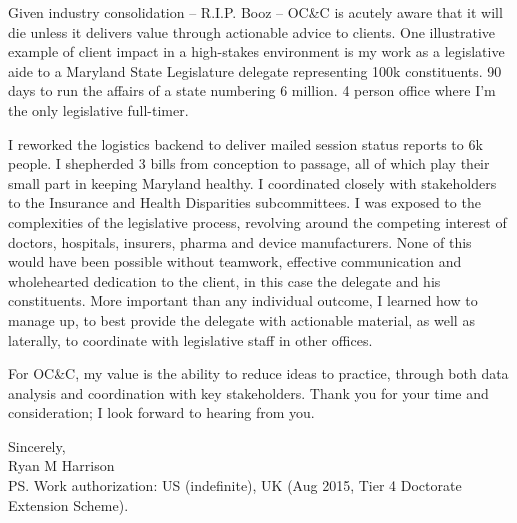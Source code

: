 \documentclass{../res}
\begin{document}
\begin{sloppypar}
\begin{resume}
Given industry consolidation -- R.I.P. Booz -- OC\&C is acutely aware that it will die unless it delivers value through actionable advice to clients. One illustrative example of client impact in a high-stakes environment is my work as a legislative aide to a Maryland State Legislature delegate representing 100k constituents. 90 days to run the affairs of a state numbering 6 million. 4 person office where I'm the only legislative full-timer.

I reworked the logistics backend to deliver mailed session status reports to 6k people. I shepherded 3 bills from conception to passage, all of which play their small part in keeping Maryland healthy. I coordinated closely with stakeholders to the Insurance and Health Disparities subcommittees. I was exposed to the complexities of the legislative process, revolving around the competing interest of doctors, hospitals, insurers, pharma and device manufacturers. None of this would have been possible without teamwork, effective communication and wholehearted dedication to the client, in this case the delegate and his constituents. More important than any individual outcome, I learned how to manage up, to best provide the delegate with actionable material, as well as laterally, to coordinate with legislative staff in other offices.

For OC\&C, my value is the ability to reduce ideas to practice, through both data analysis and coordination with key stakeholders. Thank you for your time and consideration; I look forward to hearing from you.

Sincerely,
\\
Ryan M Harrison \\
PS. Work authorization: US (indefinite), UK (Aug 2015, Tier 4 Doctorate Extension Scheme).

\end{resume} 
\end{sloppypar}
\end{document}

